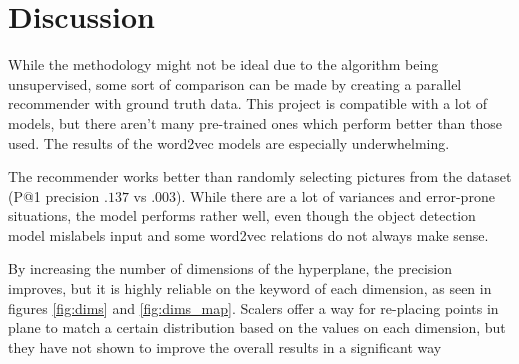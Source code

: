 \section{Discussion}
\label{sec:results_discussion}

While the methodology might not be ideal due to the algorithm being unsupervised, some sort of comparison can be made by creating a parallel recommender with ground truth data. This project is compatible with a lot of models, but there aren't many pre-trained ones which perform better than those used. The results of the word2vec models are especially underwhelming.

The recommender works better than randomly selecting pictures from the dataset (P@1 precision $.137$ vs $.003$). While there are a lot of variances and error-prone situations, the model performs rather well, even though the object detection model mislabels input and some word2vec relations do not always make sense.

By increasing the number of dimensions of the hyperplane, the precision improves, but it is highly reliable on the keyword of each dimension, as seen in figures \ref{fig:dims} and \ref{fig:dims_map}. Scalers offer a way for re-placing points in plane to match a certain distribution based on the values on each dimension, but they have not shown to improve the overall results in a significant way
